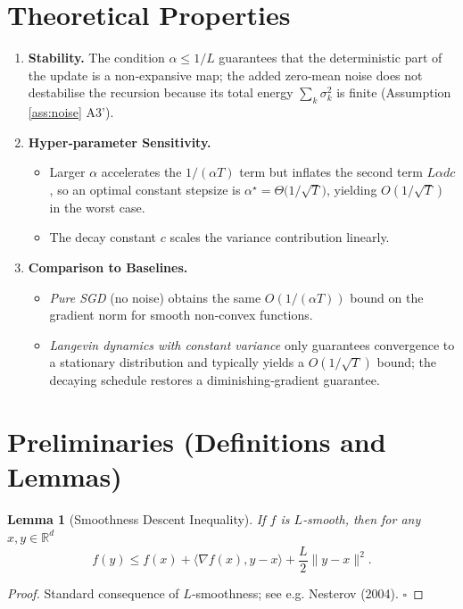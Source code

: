 \documentclass{article}
\newtheorem{lemma}{Lemma}
\newcommand{\R}{\mathbb{R}}
\begin{document}
\section*{Theoretical Properties}
\begin{enumerate}[label=\arabic*.]
\item \textbf{Stability.} The condition $\alpha\le1/L$ guarantees that the
deterministic part of the update is a non‑expansive map; the added
zero‑mean noise does not destabilise the recursion because its total
energy $\sum_{k}\sigma_{k}^{2}$ is finite (Assumption \ref{ass:noise} A3').

\item \textbf{Hyper‑parameter Sensitivity.}
    \begin{itemize}
        \item Larger $\alpha$ accelerates the $1/(\alpha T)$ term but
        inflates the second term $L\alpha d c$, so an optimal constant
        stepsize is $\alpha^{\star}= \Theta\!\bigl(1/\sqrt{T}\bigr)$,
        yielding $O(1/\sqrt{T})$ in the worst case.
        \item The decay constant $c$ scales the variance contribution linearly.
    \end{itemize}

\item \textbf{Comparison to Baselines.}
    \begin{itemize}
        \item \emph{Pure SGD} (no noise) obtains the same $O(1/(\alpha T))$
        bound on the gradient norm for smooth non‑convex functions.
        \item \emph{Langevin dynamics with constant variance}
        only guarantees convergence to a stationary distribution and
        typically yields a $O(1/\sqrt{T})$ bound; the decaying schedule
        restores a diminishing‑gradient guarantee.
    \end{itemize}
\end{enumerate}

\section*{Preliminaries (Definitions and Lemmas)}
\begin{lemma}[Smoothness Descent Inequality]\label{lem:smooth}
If $f$ is $L$‑smooth, then for any $x,y\in\R^{d}$
\[
f(y)\le f(x)+\langle\nabla f(x),y-x\rangle+\frac{L}{2}\|y-x\|^{2}.
\tag{L1}
\]
\end{lemma}
\begin{proof}
Standard consequence of $L$‑smoothness; see e.g. Nesterov (2004). $\square$
\end{proof}
\end{document}
